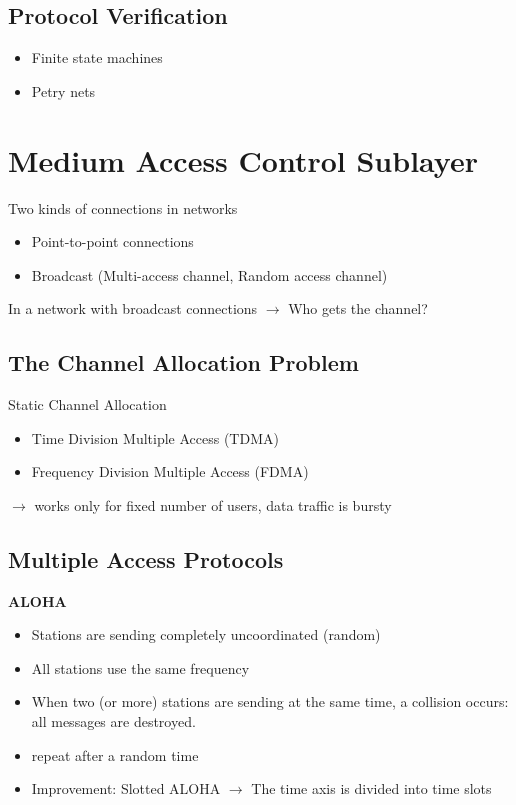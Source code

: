 \documentclass[11pt,ngerman]{article}
\begin{document}
\subsection{Protocol Verification}
\begin{itemize}[noitemsep,nolistsep]
\item Finite	state	machines
\item Petry nets
\end{itemize}

\section{Medium	Access	Control	Sublayer}
Two	kinds	of	connections	in	networks
\begin{itemize}[noitemsep,nolistsep]
\item Point-to-point	connections
\item Broadcast	
(Multi-access	channel,	Random	access	
channel)
\end{itemize}

In	a	network	with	broadcast	
connections $\rightarrow$ Who	gets	the	channel?

\subsection{The	Channel	Allocation	Problem}
Static	Channel	Allocation
\begin{itemize}[noitemsep,nolistsep]
\item Time	Division	Multiple	Access	(TDMA)
\item Frequency	Division	Multiple	Access	(FDMA)
\end{itemize}
$\rightarrow$ works only for fixed number of users, data traffic is bursty

\subsection{Multiple	Access	Protocols}
\textbf{ALOHA}	
\begin{itemize}[noitemsep,nolistsep]
\item Stations	are	sending	completely	uncoordinated	(random)
\item All	stations	use	the	same	frequency
\item When	two	(or	more)	stations	are	sending	at	the	same	time,	a	collision	occurs:	all	
messages	are	destroyed.	
\item repeat	after	a	random	time
\item Improvement:	Slotted	ALOHA $\rightarrow$ The	time	axis	is	divided	into	time	slots\\
\end{itemize}
\end{document}
